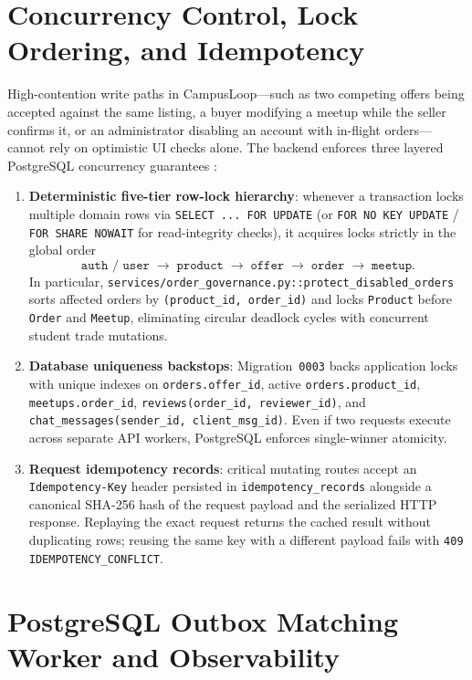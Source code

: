 \section{Concurrency Control, Lock Ordering, and Idempotency}
\label{sec:impl-concurrency}

High-contention write paths in CampusLoop---such as two competing offers being accepted against the same listing, a buyer modifying a meetup while the seller confirms it, or an administrator disabling an account with in-flight orders---cannot rely on optimistic UI checks alone. The backend enforces three layered PostgreSQL concurrency guarantees \cite{postgresExplicitLocking}:
\begin{enumerate}
  \item \textbf{Deterministic five-tier row-lock hierarchy}: whenever a transaction locks multiple domain rows via \texttt{SELECT ... FOR UPDATE} (or \texttt{FOR NO KEY UPDATE} / \texttt{FOR SHARE NOWAIT} for read-integrity checks), it acquires locks strictly in the global order
  \[
    \texttt{auth / user} \;\longrightarrow\; \texttt{product} \;\longrightarrow\; \texttt{offer} \;\longrightarrow\; \texttt{order} \;\longrightarrow\; \texttt{meetup}.
  \]
  In particular, \texttt{services/order\_governance.py::protect\_disabled\_orders} sorts affected orders by \texttt{(product\_id, order\_id)} and locks \texttt{Product} before \texttt{Order} and \texttt{Meetup}, eliminating circular deadlock cycles with concurrent student trade mutations.
  \item \textbf{Database uniqueness backstops}: Migration~\texttt{0003} backs application locks with unique indexes on \texttt{orders.offer\_id}, active \texttt{orders.product\_id}, \texttt{meetups.order\_id}, \texttt{reviews(\allowbreak order\_id, reviewer\_id)}, and \texttt{chat\_\allowbreak messages(\allowbreak sender\_id, \allowbreak client\_\allowbreak msg\_id)}. Even if two requests execute across separate API workers, PostgreSQL enforces single-winner atomicity.
  \item \textbf{Request idempotency records}: critical mutating routes accept an \texttt{Idempotency-Key} header persisted in \texttt{idempotency\_records} alongside a canonical SHA-256 hash of the request payload and the serialized HTTP response. Replaying the exact request returns the cached result without duplicating rows; reusing the same key with a different payload fails with \texttt{409 IDEMPOTENCY\_CONFLICT}.
\end{enumerate}

\section{PostgreSQL Outbox Matching Worker and Observability}
\label{sec:impl-worker}

